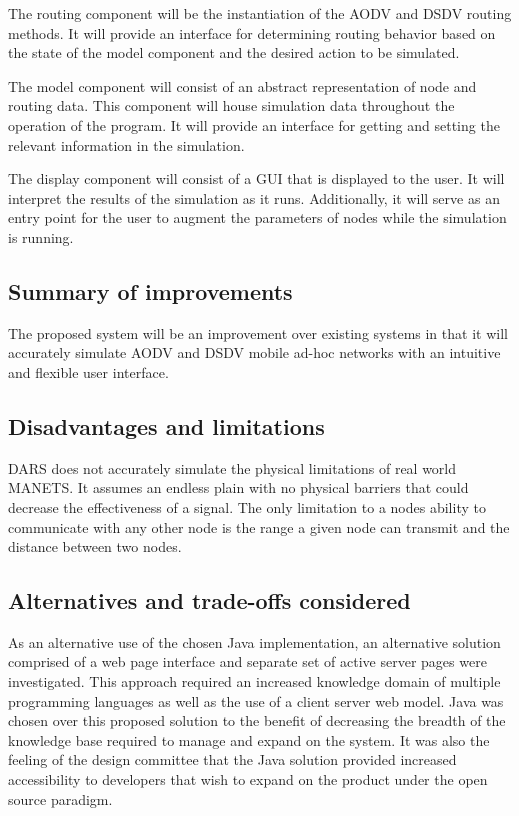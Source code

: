 \documentclass[a4paper,11pt,titlepage]{article}
\begin{document}
The routing component will be the instantiation of the AODV and DSDV routing methods. It will provide an interface for determining routing behavior based on the state of the model component and the desired action to be simulated. 
 
The model component will consist of an abstract representation of node and routing data. This component will house simulation data throughout the operation of the program. It will provide an interface for getting and setting the relevant information in the simulation. 
 
The display component will consist of a GUI that is displayed to the user. It will interpret the results of the simulation as it runs. Additionally, it will serve as an entry point for the user to augment the parameters of nodes while the simulation is running.
 
\subsection{Summary of improvements}
The proposed system will be an improvement over existing systems in that it will accurately simulate AODV and DSDV mobile ad-hoc networks with an intuitive and flexible user interface. 
 
\subsection{Disadvantages and limitations}
DARS does not accurately simulate the physical limitations of real world MANETS.  It assumes an endless plain with no physical barriers that could decrease the effectiveness of a signal.  The only limitation to a nodes ability to communicate with any other node is the range a given node can transmit and the distance between two nodes.
 
\subsection{Alternatives and trade-offs considered}
As an alternative use of the chosen Java implementation, an alternative solution comprised of a web page interface and separate set of active server pages were investigated.  This approach required an increased knowledge domain of multiple programming languages as well as the use of a client server web model.  Java was chosen over this proposed solution to the benefit of decreasing the breadth of the knowledge base required to manage and expand on the system.  It was also the feeling of the design committee that the Java solution provided increased accessibility to developers that wish to expand on the product under the open source paradigm.
 
\end{document}
